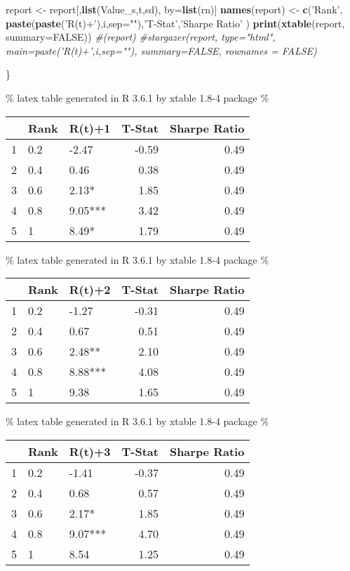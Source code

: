 \documentclass[
]{article}
\newenvironment{Shaded}{\begin{snugshade}}{\end{snugshade}}
\newcommand{\CommentTok}[1]{\textcolor[rgb]{0.56,0.35,0.01}{\textit{#1}}}
\newcommand{\DataTypeTok}[1]{\textcolor[rgb]{0.13,0.29,0.53}{#1}}
\newcommand{\KeywordTok}[1]{\textcolor[rgb]{0.13,0.29,0.53}{\textbf{#1}}}
\newcommand{\NormalTok}[1]{#1}
\newcommand{\OtherTok}[1]{\textcolor[rgb]{0.56,0.35,0.01}{#1}}
\newcommand{\StringTok}[1]{\textcolor[rgb]{0.31,0.60,0.02}{#1}}
\begin{document}
\begin{Shaded}
\begin{Highlighting}[]
\NormalTok{    report <-}\StringTok{ }\NormalTok{report[,}\KeywordTok{list}\NormalTok{(Value_s,t,sd), by=}\KeywordTok{list}\NormalTok{(rn)]}
    \KeywordTok{names}\NormalTok{(report) <-}\StringTok{ }\KeywordTok{c}\NormalTok{(}\StringTok{'Rank'}\NormalTok{, }\KeywordTok{paste}\NormalTok{(}\KeywordTok{paste}\NormalTok{(}\StringTok{'R(t)+'}\NormalTok{),i,}\DataTypeTok{sep=}\StringTok{""}\NormalTok{),}\StringTok{'T-Stat'}\NormalTok{,}\StringTok{'Sharpe Ratio'}\NormalTok{ )}
    \KeywordTok{print}\NormalTok{(}\KeywordTok{xtable}\NormalTok{(report, }\DataTypeTok{summary=}\OtherTok{FALSE}\NormalTok{))}
    \CommentTok{#(report)}
    \CommentTok{#stargazer(report, type="html", main=paste('R(t)+',i,sep=""), summary=FALSE, rownames = FALSE)}

\NormalTok{\}}
\end{Highlighting}
\end{Shaded}

\% latex table generated in R 3.6.1 by xtable 1.8-4 package \%

\begin{tabular}{rllrr}
  \hline
 & Rank & R(t)+1 & T-Stat & Sharpe Ratio \\ 
  \hline
1 & 0.2 & -2.47 & -0.59 & 0.49 \\ 
  2 & 0.4 & 0.46 & 0.38 & 0.49 \\ 
  3 & 0.6 & 2.13* & 1.85 & 0.49 \\ 
  4 & 0.8 & 9.05*** & 3.42 & 0.49 \\ 
  5 & 1 & 8.49* & 1.79 & 0.49 \\ 
   \hline
\end{tabular}

\% latex table generated in R 3.6.1 by xtable 1.8-4 package \%

\begin{tabular}{rllrr}
  \hline
 & Rank & R(t)+2 & T-Stat & Sharpe Ratio \\ 
  \hline
1 & 0.2 & -1.27 & -0.31 & 0.49 \\ 
  2 & 0.4 & 0.67 & 0.51 & 0.49 \\ 
  3 & 0.6 & 2.48** & 2.10 & 0.49 \\ 
  4 & 0.8 & 8.88*** & 4.08 & 0.49 \\ 
  5 & 1 & 9.38 & 1.65 & 0.49 \\ 
   \hline
\end{tabular}

\% latex table generated in R 3.6.1 by xtable 1.8-4 package \%

\begin{tabular}{rllrr}
  \hline
 & Rank & R(t)+3 & T-Stat & Sharpe Ratio \\ 
  \hline
1 & 0.2 & -1.41 & -0.37 & 0.49 \\ 
  2 & 0.4 & 0.68 & 0.57 & 0.49 \\ 
  3 & 0.6 & 2.17* & 1.85 & 0.49 \\ 
  4 & 0.8 & 9.07*** & 4.70 & 0.49 \\ 
  5 & 1 & 8.54 & 1.25 & 0.49 \\ 
   \hline
\end{tabular}
\end{document}
